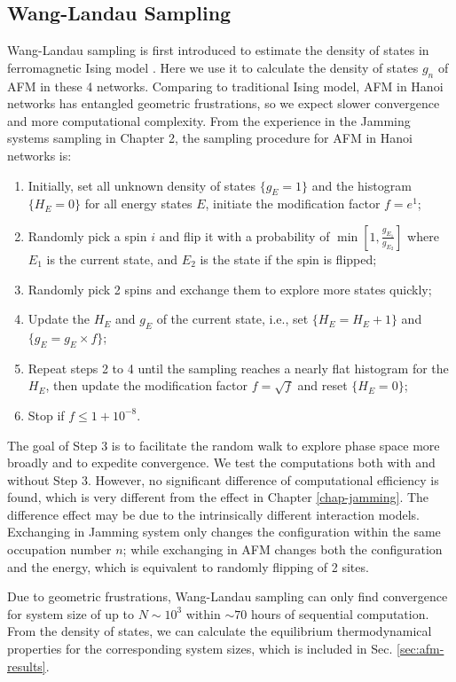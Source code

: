\subsection{Wang-Landau Sampling}
Wang-Landau sampling is first introduced to estimate the density of states in ferromagnetic Ising model \cite{Wang2001}. Here we use it to calculate the density of states $g_{n}$ of AFM in
these 4 networks. Comparing to traditional Ising model, AFM in Hanoi networks has entangled geometric frustrations, so we expect slower convergence and more computational complexity. From the experience in the Jamming systems sampling in Chapter 2, the sampling procedure for AFM in Hanoi networks is: 
\begin{enumerate}
\item Initially, set all unknown density of states $\{g_{E}=1\}$ and the
histogram $\{H_{E}=0\}$ for all energy states $E$, initiate the modification
factor $f=e^1$; 
\item Randomly pick a spin $i$ and flip it with a probability of $\min\left[1,\frac{g_{E_1}}{g_{E_2}}\right]$ where $E_1$ is the current state, and $E_2$ is the state if the spin is flipped;
\item Randomly pick 2 spins and exchange them to explore more states quickly; 
\item Update the $H_{E}$ and $g_{E}$ of the current state, i.e., set $\{H_{E}=H_{E}+1\}$
and $\{g_{E}=g_{E}\times f\}$; 
\item Repeat steps 2 to 4 until the sampling reaches a nearly flat histogram
for the $H_{E}$, then update the modification factor $f=\sqrt{f}$
and reset $\{H_{E}=0\}$; 
\item Stop if $f\le1+10^{-8}$. 
\end{enumerate}

The goal of Step 3 is to facilitate the random walk to explore phase space more broadly and to expedite convergence. We test the computations both with and without Step 3. However, no significant difference of computational efficiency is found, which is very different from the effect in Chapter \ref{chap-jamming}. The difference effect may be due to the intrinsically different interaction models. Exchanging in Jamming system only changes the configuration within the same occupation number $n$; while exchanging in AFM changes both the configuration and the energy, which is equivalent to randomly flipping of 2 sites.  

Due to geometric frustrations, Wang-Landau sampling can only find convergence for system size of up to $N\sim10^{3}$ within $\sim70$ hours of sequential computation. From the density of states, we can calculate the equilibrium thermodynamical properties for the corresponding system sizes, which is included in Sec. \ref{sec:afm-results}. 

